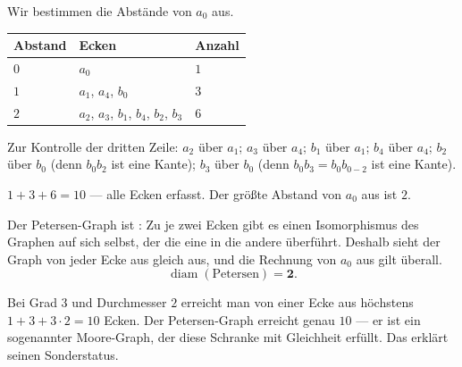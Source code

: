 \begin{aufgabe}
Wir bestimmen die Abstände von $a_0$ aus.
\begin{center}
\renewcommand{\arraystretch}{1.42}
\begin{tabular}{@{}P{1.8cm}P{4.2cm}P{1.4cm}@{}}
\toprule
\textbf{Abstand} & \textbf{Ecken} & \textbf{Anzahl}\\
\midrule
$0$ & $a_0$ & $1$\\
$1$ & $a_1$, $a_4$, $b_0$ & $3$\\
$2$ & $a_2$, $a_3$, $b_1$, $b_4$, $b_2$, $b_3$ & $6$\\
\bottomrule
\end{tabular}
\end{center}
Zur Kontrolle der dritten Zeile: $a_2$ über $a_1$; $a_3$ über $a_4$; $b_1$ über $a_1$; $b_4$ über $a_4$; $b_2$ über $b_0$ (denn $b_0 b_2$ ist eine Kante); $b_3$ über $b_0$ (denn $b_0 b_3 = b_0 b_{0-2}$ ist eine Kante).

$1 + 3 + 6 = 10$ --- alle Ecken erfasst. Der größte Abstand von $a_0$ aus ist $2$.

Der Petersen-Graph ist : Zu je zwei Ecken gibt es einen Isomorphismus des Graphen auf sich selbst, der die eine in die andere überführt. Deshalb sieht der Graph von jeder Ecke aus gleich aus, und die Rechnung von $a_0$ aus gilt überall.
\[ \operatorname{diam}(\text{Petersen}) = \mathbf{2} . \]

Bei Grad $3$ und Durchmesser $2$ erreicht man von einer Ecke aus höchstens $1 + 3 + 3\cdot 2 = 10$ Ecken. Der Petersen-Graph erreicht genau $10$ --- er ist ein sogenannter Moore-Graph, der diese Schranke mit Gleichheit erfüllt. Das erklärt seinen Sonderstatus. \checkmark
\end{aufgabe}

